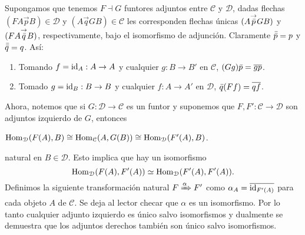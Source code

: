 \documentclass{comunicaciones}
\begin{document}
\begin{obs}\label{adjcomp}
	Supongamos que tenemos $F\dashv G$ funtores adjuntos entre $\mathcal{C}$ y $\mathcal{D}$, dadas flechas $(FA\overset{\to}{p} B)\in\mathcal{D}$ y $(A\overset{\to}{q} GB)\in\mathcal{C}$ les corresponden flechas \'unicas $(A\overset{\to}{\Bar{p}}GB)$	y $(FA\overset{\to}{\Bar{q}}B)$,
	respectivamente, bajo el isomorfismo de adjunci\'on. Claramente $\Bar{\Bar{p}}=p$ y $\Bar{\Bar{q}}=q$. As\'i:
	\begin{enumerate}
		\item
		Tomando $f=\mathrm{id}_A:A\to A$ y cualquier $g:B\to B'$ en $\mathcal{C}$, $(Gg)\bar p=\overline{gp}$.
		\item
		Tomado $g=\mathrm{id}_B:B\to B$ y cualquier $f:A\to A'$ en $\mathcal{D}$, $\bar q(Ff)=\overline{qf}$.
	\end{enumerate}
\end{obs}

Ahora, notemos que si $G: \mathcal{D} \longrightarrow  \mathcal{C}$ es un funtor y suponemos que  $F,F': \mathcal{C} \longrightarrow  \mathcal{D}$ son adjuntos izquierdo de $G$, entonces 
\begin{center}
	$\mathrm{Hom}_\mathcal{D}(F(A),B)\cong \mathrm{Hom}_\mathcal{C}(A,G(B)) \cong \mathrm{Hom}_\mathcal{D}(F'(A),B)$.
\end{center}
natural en $B \in \mathcal{D}$. Esto implica que hay un isomorfismo 
\[\mathrm{Hom}_\mathcal{D}(F(A),F'(A))\simeq \mathrm{Hom}_\mathcal{D}(F'(A),F'(A)).\]
Definimos la siguiente transformaci\'on natural $F\xRightarrow{\alpha}F'$ como $\alpha_A=\overline{\mathrm{id}_{F'(A)}}$ para cada objeto $A$ de $\mathcal{C}$. Se deja al lector checar que $\alpha$ es un isomorfismo. Por lo tanto cualquier adjunto izquierdo es único salvo isomorfismos y dualmente se demuestra que los adjuntos derechos también son único salvo isomorfismos.
\end{document}
